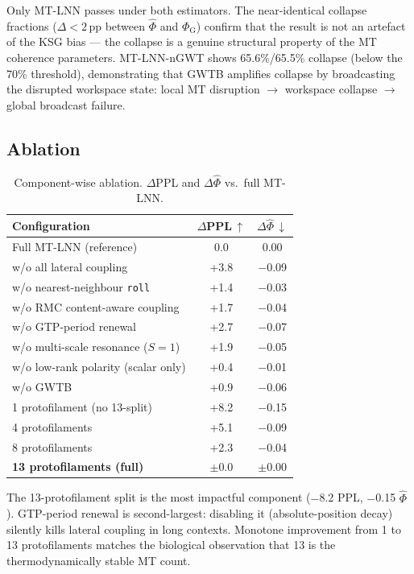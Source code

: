 \documentclass[11pt]{article}
\theoremstyle{definition}
\newcommand{\phihat}{\hat{\Phi}}
\newcommand{\phig}{\Phi_{\mathrm{G}}}
\begin{document}
Only MT-LNN passes under both estimators. The near-identical collapse fractions ($\Delta<2$\,pp between $\phihat$ and $\phig$) confirm that the result is not an artefact of the KSG bias — the collapse is a genuine structural property of the MT coherence parameters. MT-LNN-nGWT shows 65.6\%/65.5\% collapse (below the 70\% threshold), demonstrating that GWTB amplifies collapse by broadcasting the disrupted workspace state: local MT disruption $\to$ workspace collapse $\to$ global broadcast failure.

\subsection{Ablation}

\begin{table}[h]
\centering
\caption{Component-wise ablation. $\Delta$PPL and $\Delta\phihat$ vs.\ full MT-LNN.}
\label{tab:ablation}
\begin{tabular}{lcc}
\toprule
Configuration & $\Delta$PPL\,$\uparrow$ & $\Delta\phihat$\,$\downarrow$ \\
\midrule
Full MT-LNN (reference) & 0.0 & 0.00 \\
\midrule
w/o all lateral coupling & +3.8 & $-$0.09 \\
w/o nearest-neighbour \texttt{roll} & +1.4 & $-$0.03 \\
w/o RMC content-aware coupling & +1.7 & $-$0.04 \\
w/o GTP-period renewal & +2.7 & $-$0.07 \\
w/o multi-scale resonance ($S=1$) & +1.9 & $-$0.05 \\
w/o low-rank polarity (scalar only) & +0.4 & $-$0.01 \\
w/o GWTB & +0.9 & $-$0.06 \\
1 protofilament (no 13-split) & +8.2 & $-$0.15 \\
4 protofilaments & +5.1 & $-$0.09 \\
8 protofilaments & +2.3 & $-$0.04 \\
\textbf{13 protofilaments (full)} & $\pm$0.0 & $\pm$0.00 \\
\bottomrule
\end{tabular}
\end{table}

The 13-protofilament split is the most impactful component ($-$8.2 PPL, $-$0.15 $\phihat$). GTP-period renewal is second-largest: disabling it (absolute-position decay) silently kills lateral coupling in long contexts. Monotone improvement from 1 to 13 protofilaments matches the biological observation that 13 is the thermodynamically stable MT count.
\end{document}
